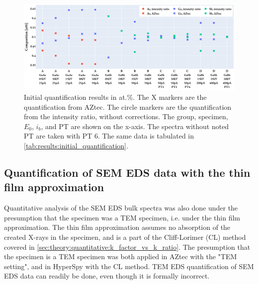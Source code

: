 



\begin{figure}[htbp]
    \centering
    \includegraphics[width=0.99\linewidth]{figures/results/initial_quantification.pdf}
    \caption{
        Initial quantification results in at.\%.
        The X markers are the quantification from AZtec.
        The circle markers are the quantification from the intensity ratio, without corrections.
        The group, specimen, $E_0$, $i_b$, and PT are shown on the x-axis.
        The spectra without noted PT are taken with PT $6$.
        The same data is tabulated in \cref{tab:results:initial_quantification}.
    }
    \label{fig:results:initial_quantification}
\end{figure}








\subsection{Quantification of SEM EDS data with the thin film approximation}
\label{results:quantification_cliff_lorimer}


Quantitative analysis of the SEM EDS bulk spectra was also done under the presumption that the specimen was a TEM specimen, i.e. under the thin film approximation.
The thin film approximation assumes no absorption of the created X-rays in the specimen, and is a part of the Cliff-Lorimer (CL) method covered in \cref{sec:theory:quantitative:k_factor_vs_k_ratio}.
The presumption that the specimen is a TEM specimen was both applied in AZtec with the "TEM setting", and in HyperSpy with the CL method.
TEM EDS quantification of SEM EDS data can readily be done, even though it is formally incorrect.

